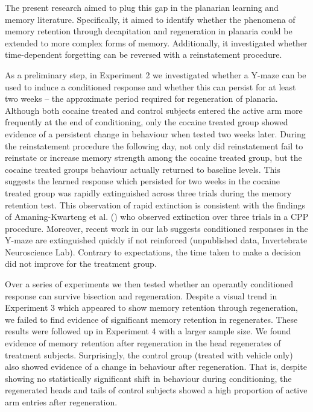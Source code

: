 \documentclass[
  jou,
  floatsintext,
  longtable,
  nolmodern,
  notxfonts,
  notimes,
  donotrepeattitle,
  colorlinks=true,linkcolor=blue,citecolor=blue,urlcolor=blue]{apa7}
\begin{document}
The present research aimed to plug this gap in the planarian learning
and memory literature. Specifically, it aimed to identify whether the
phenomena of memory retention through decapitation and regeneration in
planaria could be extended to more complex forms of memory.
Additionally, it investigated whether time-dependent forgetting can be
reversed with a reinstatement procedure.

As a preliminary step, in Experiment 2 we investigated whether a Y-maze
can be used to induce a conditioned response and whether this can
persist for at least two weeks -- the approximate period required for
regeneration of planaria. Although both cocaine treated and control
subjects entered the active arm more frequently at the end of
conditioning, only the cocaine treated group showed evidence of a
persistent change in behaviour when tested two weeks later. During the
reinstatement procedure the following day, not only did reinstatement
fail to reinstate or increase memory strength among the cocaine treated
group, but the cocaine treated groups behaviour actually returned to
baseline levels. This suggests the learned response which persisted for
two weeks in the cocaine treated group was rapidly extinguished across
three trials during the memory retention test. This observation of rapid
extinction is consistent with the findings of Amaning-Kwarteng et al.
() who observed
extinction over three trials in a CPP procedure. Moreover, recent work
in our lab suggests conditioned responses in the Y-maze are extinguished
quickly if not reinforced (unpublished data, Invertebrate Neuroscience
Lab). Contrary to expectations, the time taken to make a decision did
not improve for the treatment group.

Over a series of experiments we then tested whether an operantly
conditioned response can survive bisection and regeneration. Despite a
visual trend in Experiment 3 which appeared to show memory retention
through regeneration, we failed to find evidence of significant memory
retention in regenerates. These results were followed up in Experiment 4
with a larger sample size. We found evidence of memory retention after
regeneration in the head regenerates of treatment subjects.
Surprisingly, the control group (treated with vehicle only) also showed
evidence of a change in behaviour after regeneration. That is, despite
showing no statistically significant shift in behaviour during
conditioning, the regenerated heads and tails of control subjects showed
a high proportion of active arm entries after regeneration.
\end{document}
